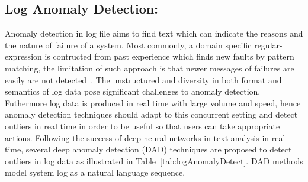\subsection{Log Anomaly Detection:}
Anomaly detection in log file aims to find text which can indicate the reasons and the nature of failure of a system. Most commonly, a domain  specific regular-expression  is contructed from past experience which finds new faults by pattern matching, the limitation of such approach is that newer messages of failures are easily are not detected~\cite{memon2008log}. The unstructured and diversity in both format and semantics of log data pose significant challenges to anomaly detection. Futhermore log data is produced in real time with large volume and speed, hence anomaly detection techniques should adapt to this concurrent setting and detect outliers in real time  in order to be useful so that users can take appropriate actions. Following the success of deep neural networks in text analysis in real time, several deep anomaly detection (DAD) techniques are proposed to detect outliers in log data as illustrated in Table~\ref{tab:logAnomalyDetect}. DAD methods model system log as a natural language sequence.


